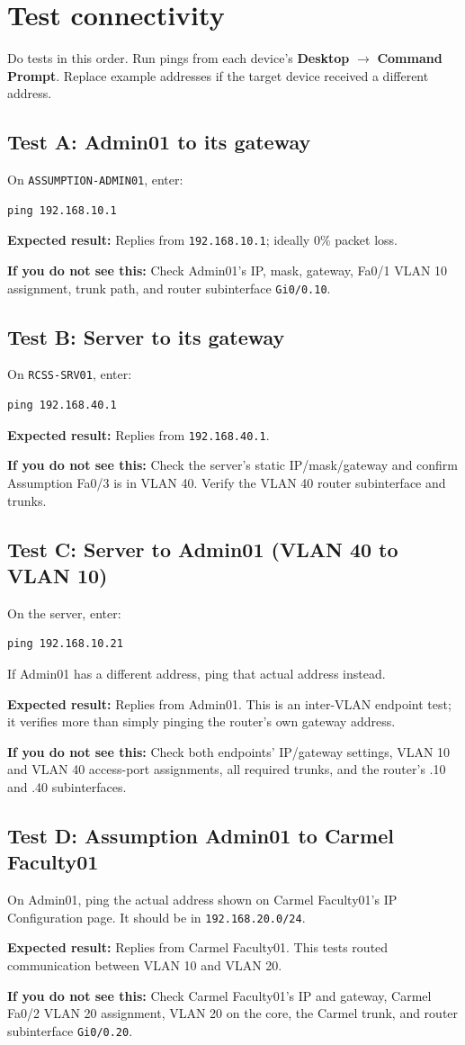 \documentclass[11pt,a4paper]{article}
\newcommand{\expected}[1]{\noindent\colorbox{noteBG}{\parbox{0.96\linewidth}{\textbf{Expected result:} #1}}\par\vspace{5pt}}
\newcommand{\ifnot}[1]{\noindent\colorbox{warnBG}{\parbox{0.96\linewidth}{\textbf{If you do not see this:} #1}}\par\vspace{5pt}}
\begin{document}
\section{Test connectivity}\label{sec:tests}
Do tests in this order. Run pings from each device's \textbf{Desktop} \(\rightarrow\) \textbf{Command Prompt}. Replace example addresses if the target device received a different address.

\subsection*{Test A: Admin01 to its gateway}
On \texttt{ASSUMPTION-ADMIN01}, enter:
\begin{lstlisting}
ping 192.168.10.1
\end{lstlisting}
\expected{Replies from \texttt{192.168.10.1}; ideally 0\% packet loss.}
\ifnot{Check Admin01's IP, mask, gateway, Fa0/1 VLAN 10 assignment, trunk path, and router subinterface \texttt{Gi0/0.10}.}

\subsection*{Test B: Server to its gateway}
On \texttt{RCSS-SRV01}, enter:
\begin{lstlisting}
ping 192.168.40.1
\end{lstlisting}
\expected{Replies from \texttt{192.168.40.1}.}
\ifnot{Check the server's static IP/mask/gateway and confirm Assumption Fa0/3 is in VLAN 40. Verify the VLAN 40 router subinterface and trunks.}

\subsection*{Test C: Server to Admin01 (VLAN 40 to VLAN 10)}
On the server, enter:
\begin{lstlisting}
ping 192.168.10.21
\end{lstlisting}
If Admin01 has a different address, ping that actual address instead.
\expected{Replies from Admin01. This is an inter-VLAN endpoint test; it verifies more than simply pinging the router's own gateway address.}
\ifnot{Check both endpoints' IP/gateway settings, VLAN 10 and VLAN 40 access-port assignments, all required trunks, and the router's .10 and .40 subinterfaces.}

\subsection*{Test D: Assumption Admin01 to Carmel Faculty01}
On Admin01, ping the actual address shown on Carmel Faculty01's IP Configuration page. It should be in \texttt{192.168.20.0/24}.
\expected{Replies from Carmel Faculty01. This tests routed communication between VLAN 10 and VLAN 20.}
\ifnot{Check Carmel Faculty01's IP and gateway, Carmel Fa0/2 VLAN 20 assignment, VLAN 20 on the core, the Carmel trunk, and router subinterface \texttt{Gi0/0.20}.}
\end{document}
